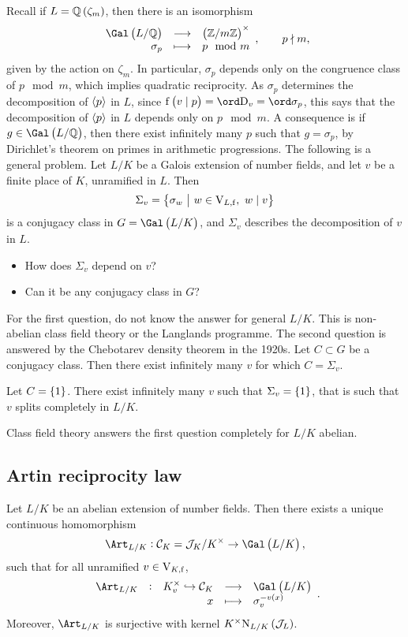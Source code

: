 
Recall if $ L = \QQ\br{\zeta_m} $, then there is an isomorphism
$$ \function{\Gal\br{L / \QQ}}{\br{\ZZ / m\ZZ}^\times}{\sigma_p}{p \mod m}, \qquad p \nmid m, $$
given by the action on $ \zeta_m $. In particular, $ \sigma_p $ depends only on the congruence class of $ p \mod m $, which implies quadratic reciprocity. As $ \sigma_p $ determines the decomposition of $ \left\langle p \right\rangle $ in $ L $, since $ \f\br{v \mid p} = \ord \D_v = \ord \sigma_p $, this says that the decomposition of $ \left\langle p \right\rangle $ in $ L $ depends only on $ p \mod m $. A consequence is if $ g \in \Gal\br{L / \QQ} $, then there exist infinitely many $ p $ such that $ g = \sigma_p $, by Dirichlet's theorem on primes in arithmetic progressions. The following is a general problem. Let $ L / K $ be a Galois extension of number fields, and let $ v $ be a finite place of $ K $, unramified in $ L $. Then
$$ \Sigma_v = \cbr{\sigma_w \st w \in \V_{L, \f}, \ w \mid v} $$
is a conjugacy class in $ G = \Gal\br{L / K} $, and $ \Sigma_v $ describes the decomposition of $ v $ in $ L $.
\begin{itemize}
\item How does $ \Sigma_v $ depend on $ v $?
\item Can it be any conjugacy class in $ G $?
\end{itemize}

For the first question, do not know the answer for general $ L / K $. This is non-abelian class field theory or the Langlands programme. The second question is answered by the Chebotarev density theorem in the 1920s. Let $ C \subset G $ be a conjugacy class. Then there exist infinitely many $ v $ for which $ C = \Sigma_v $.

\begin{example*}
Let $ C = \cbr{1} $. There exist infinitely many $ v $ such that $ \Sigma_v = \cbr{1} $, that is such that $ v $ splits completely in $ L / K $.
\end{example*}

Class field theory answers the first question completely for $ L / K $ abelian.

\subsection{Artin reciprocity law}

\begin{theorem*}
Let $ L / K $ be an abelian extension of number fields. Then there exists a unique continuous homomorphism
$$ \Art_{L / K} : \CCC_K = \JJJ_K / K^\times \to \Gal\br{L / K}, $$
such that for all unramified $ v \in \mathrm{V}_{K, \mathrm{f}} $,
$$ \function[\Art_{L / K}]{K_v^\times \hookrightarrow \CCC_K}{\Gal\br{L / K}}{x}{\sigma_v^{-v\br{x}}}. $$
Moreover, $ \Art_{L / K} $ is surjective with kernel $ K^\times \N_{L / K}\br{\JJJ_L} $.
\end{theorem*}

